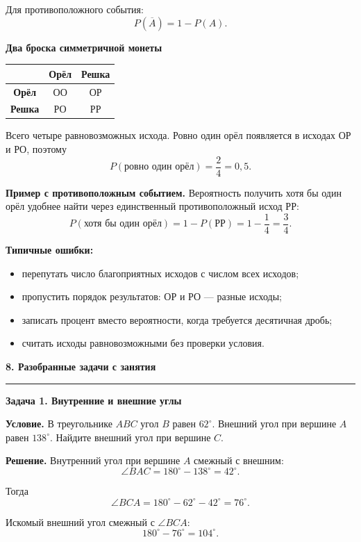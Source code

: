 \documentclass[a4paper,12pt]{article}
\newcommand{\Section}[1]{%
  \Needspace{5\baselineskip}%
  \vspace{0.6em}%
  {\Large\bfseries\color{darkaccent}#1}\par
  \vspace{0.2em}%
  {\color{accent}\rule{0.14\linewidth}{1.2pt}}\par
  \vspace{0.4em}%
}
\newcommand{\Subsection}[1]{%
  \Needspace{3\baselineskip}%
  \vspace{0.45em}%
  {\large\bfseries\color{darkaccent}#1}\par
  \vspace{0.15em}%
}
\newcommand{\Key}[1]{\textbf{\color{darkaccent}#1}}
\newcommand{\degree}{^{\circ}}
\begin{document}
Для противоположного события:
\[
  P(\overline{A})=1-P(A).
\]

\Subsection{Два броска симметричной монеты}

\begin{center}
\begin{tabular}{@{}c cc@{}}
\toprule
 & \textbf{Орёл} & \textbf{Решка} \\
\midrule
\textbf{Орёл} & ОО & ОР \\
\textbf{Решка} & РО & РР \\
\bottomrule
\end{tabular}
\end{center}

Всего четыре равновозможных исхода.
Ровно один орёл появляется в исходах ОР и РО, поэтому
\[
  P(\text{ровно один орёл})
  =
  \frac{2}{4}
  =
  0{,}5.
\]

\Key{Пример с противоположным событием.}
Вероятность получить хотя бы один орёл удобнее найти через единственный
противоположный исход РР:
\[
  P(\text{хотя бы один орёл})
  =
  1-P(\text{РР})
  =
  1-\frac14
  =
  \frac34.
\]

\Key{Типичные ошибки:}

\begin{itemize}
  \item перепутать число благоприятных исходов с числом всех исходов;
  \item пропустить порядок результатов: ОР и РО — разные исходы;
  \item записать процент вместо вероятности, когда требуется десятичная дробь;
  \item считать исходы равновозможными без проверки условия.
\end{itemize}

\clearpage

\Section{8. Разобранные задачи с занятия}

\Subsection{Задача 1. Внутренние и внешние углы}

\Key{Условие.}
В треугольнике $ABC$ угол $B$ равен $62\degree$.
Внешний угол при вершине $A$ равен $138\degree$.
Найдите внешний угол при вершине $C$.

\Key{Решение.}
Внутренний угол при вершине $A$ смежный с внешним:
\[
  \angle BAC
  =
  180\degree-138\degree
  =
  42\degree.
\]

Тогда
\[
  \angle BCA
  =
  180\degree-62\degree-42\degree
  =
  76\degree.
\]

Искомый внешний угол смежный с $\angle BCA$:
\[
  180\degree-76\degree
  =
  104\degree.
\]
\end{document}
